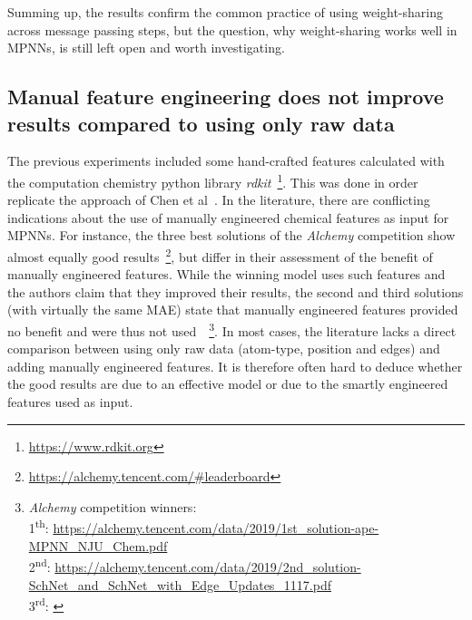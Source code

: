 Summing up, the results confirm the common practice of using weight-sharing across message passing steps, but the question, why weight-sharing works well in MPNNs, is still left open and worth investigating.


\subsection{Manual feature engineering does not improve results compared to using only raw data}
\label{sec:raw-data}

The previous experiments included some hand-crafted features calculated with the computation chemistry python library \textit{rdkit}~\footnote{\url{https://www.rdkit.org}}. This was done in order replicate the approach of Chen et al~\cite{Chen2019}. In the literature, there are conflicting indications about the use of manually engineered chemical features as input for MPNNs. For instance, the three best solutions of the \textit{Alchemy} competition show almost equally good results~\footnote{\url{https://alchemy.tencent.com/\#leaderboard}}, but differ in their assessment of the benefit of manually engineered features. While the winning model uses such features and the authors claim that they improved their results, the second and third solutions (with virtually the same MAE) state that manually engineered features provided no benefit and were thus not used~\cite{Klicpera2019}~\footnote{
\textit{Alchemy} competition winners: \\
	1\textsuperscript{th}: \url{https://alchemy.tencent.com/data/2019/1st_solution-ape-MPNN_NJU_Chem.pdf} \\
	2\textsuperscript{nd}: \url{https://alchemy.tencent.com/data/2019/2nd_solution-SchNet_and_SchNet_with_Edge_Updates_1117.pdf}\\
	3\textsuperscript{rd}: \cite{Klicpera2019}
}.
In most cases, the literature lacks a direct comparison between using only raw data (atom-type, position and edges) and adding manually engineered features. It is therefore often hard to deduce whether the good results are due to an effective model or due to the smartly engineered features used as input.

